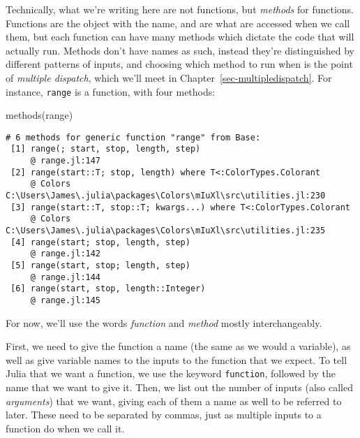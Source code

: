 \documentclass[
  letterpaper,
  DIV=11,
  numbers=noendperiod]{scrreprt}
\newenvironment{Shaded}{\begin{snugshade}}{\end{snugshade}}
\newcommand{\FunctionTok}[1]{\textcolor[rgb]{0.28,0.35,0.67}{#1}}
\newcommand{\NormalTok}[1]{\textcolor[rgb]{0.00,0.23,0.31}{#1}}
\begin{document}
\begin{tcolorbox}[enhanced jigsaw, toprule=.15mm, opacitybacktitle=0.6, leftrule=.75mm, breakable, coltitle=black, bottomrule=.15mm, colbacktitle=quarto-callout-note-color!10!white, bottomtitle=1mm, rightrule=.15mm, title=\textcolor{quarto-callout-note-color}{\faInfo}\hspace{0.5em}{Note}, colframe=quarto-callout-note-color-frame, left=2mm, colback=white, opacityback=0, arc=.35mm, toptitle=1mm, titlerule=0mm]

Technically, what we're writing here are not functions, but
\emph{methods} for functions. Functions are the object with the name,
and are what are accessed when we call them, but each function can have
many methods which dictate the code that will actually run. Methods
don't have names as such, instead they're distinguished by different
patterns of inputs, and choosing which method to run when is the point
of \emph{multiple dispatch}, which we'll meet in
Chapter~\ref{sec-multipledispatch}. For instance, \texttt{range} is a
function, with four methods:

\begin{Shaded}
\begin{Highlighting}[]
\FunctionTok{methods}\NormalTok{(range)}
\end{Highlighting}
\end{Shaded}

\begin{verbatim}
# 6 methods for generic function "range" from Base:
 [1] range(; start, stop, length, step)
     @ range.jl:147
 [2] range(start::T; stop, length) where T<:ColorTypes.Colorant
     @ Colors C:\Users\James\.julia\packages\Colors\mIuXl\src\utilities.jl:230
 [3] range(start::T, stop::T; kwargs...) where T<:ColorTypes.Colorant
     @ Colors C:\Users\James\.julia\packages\Colors\mIuXl\src\utilities.jl:235
 [4] range(start; stop, length, step)
     @ range.jl:142
 [5] range(start, stop; length, step)
     @ range.jl:144
 [6] range(start, stop, length::Integer)
     @ range.jl:145
\end{verbatim}

For now, we'll use the words \emph{function} and \emph{method} mostly
interchangeably.

\end{tcolorbox}

First, we need to give the function a name (the same as we would a
variable), as well as give variable names to the inputs to the function
that we expect. To tell Julia that we want a function, we use the
keyword \texttt{function}, followed by the name that we want to give it.
Then, we list out the number of inputs (also called \emph{arguments})
that we want, giving each of them a name as well to be referred to
later. These need to be separated by commas, just as multiple inputs to
a function do when we call it.
\end{document}
